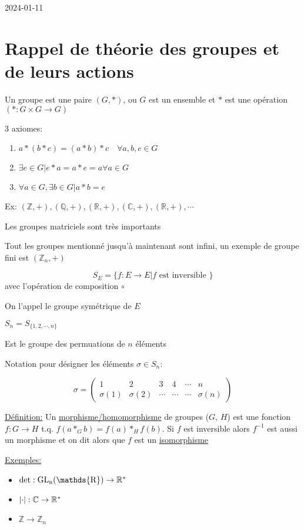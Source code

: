 


2024-01-11

\section{Rappel de théorie des groupes et de leurs actions}

Un groupe est une paire $(G, *)$, ou $G$ est un ensemble et $*$ est une opération $(*: G \times G \to G)$

3 axiomes:
\begin{enumerate}
	\item $a * (b *c) = (a * b) *c \quad \forall a,b,c \in G$	
	\item $\exists e \in G | e * a = a * e = a \forall a \in G$
	\item $\forall a \in G, \exists b \in G | a*b = e$
\end{enumerate}

Ex: $(\mathds{Z}, +), (\mathds{Q}, +), (\mathds{R}, +), (\mathds{C}, +), (\mathds{R}, +), \dotsb$

Les groupes matriciels sont très importants 

Tout les groupes mentionné jusqu'à maintenant sont infini, un exemple de groupe fini est $(\mathds{Z}_n, +)$

\[ S_E = \{ f: E\to E | f \text{ est inversible }  \}  \]
avec l'opération de composition $\circ$

On l'appel le groupe symétrique de $E$

$S_n = S_{\{ 1,2, \dotsb, n \} }$

Est le groupe des permuations de $n$ éléments

Notation pour désigner les éléments $\sigma \in S_n$:

\[ \sigma = \begin{pmatrix} 1 &2 &3 & 4 & \dotsb & n\\ \sigma(1)& \sigma(2)& \dotsb & \dotsb & \dotsb & \sigma(n) \end{pmatrix}  \]

\underline{Définition:} Un \underline{morphisme/homomorphisme} de groupes ($G,\, H$) est une fonction $f: G \to H$ t.q. $f(a *_G b) = f(a) *_H f(b)$. Si $f$ est inversible alors $f^{-1}$ est aussi un morphisme et on dit alors que $f$ est un \underline{isomorphisme} 

\underline{Exemples:} 

\begin{itemize}
	\item $\rm{det}: \rm{GL}_n (\mathds{R}) \to \mathbb{R}^{*}$
	\item $\abs{\cdot} : \mathbb{C} \to \mathbb{R} ^{*}$
	\item $\mathbb{Z} \to \mathbb{Z}_n$
\end{itemize}


